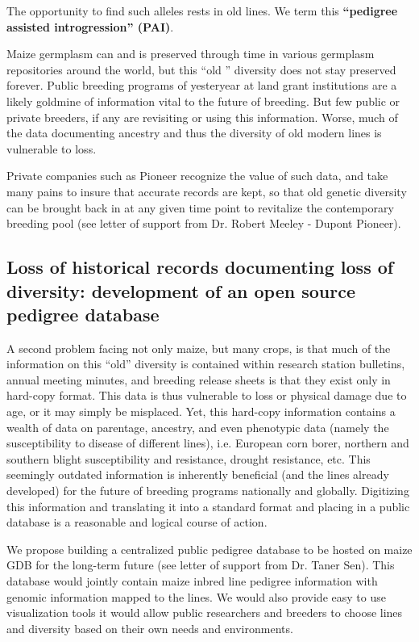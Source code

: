 \documentclass[12pt]{article}
\begin{document}
The opportunity to find such alleles rests in old lines. We term this \textbf{``pedigree assisted introgression'' (PAI)}.


Maize germplasm can and is preserved through time in various germplasm repositories around the world, but this ``old '' diversity  does not stay preserved forever. Public breeding programs of yesteryear at land grant institutions are a likely goldmine of information vital to the future of breeding. But few public or private breeders, if any are revisiting or using this information. Worse, much of the data documenting ancestry and thus the diversity of old modern lines is vulnerable to loss. 
\par Private companies such as Pioneer recognize the value of such data, and take many pains to insure that accurate records are kept, so that old genetic diversity can be brought back in at any given time point to revitalize the contemporary breeding pool (see letter of support from Dr. Robert Meeley - Dupont Pioneer).

\subsection{Loss of historical records documenting loss of diversity: development of an open source pedigree database}
A second problem facing not only maize, but many crops, is that much of the information on this ``old'' diversity is contained within research station bulletins, annual meeting minutes, and breeding release sheets is that they exist only in hard-copy format. This data is thus vulnerable to loss or physical damage due to age, or it may simply be misplaced. Yet, this hard-copy information contains a wealth of data on parentage, ancestry, and even phenotypic data (namely the susceptibility to disease of different lines), i.e. European corn borer, northern and southern blight susceptibility and resistance, drought resistance, etc. This seemingly outdated information is inherently beneficial (and the lines already developed) for the future of breeding programs nationally and globally. Digitizing this information and translating it into a standard format and placing in a public database is a reasonable and logical course of action.
\par We propose building a centralized public pedigree database to be hosted on maize GDB for the long-term future (see letter of support from Dr. Taner Sen). This database would jointly contain maize inbred line pedigree information with genomic information mapped to the lines. We would also provide easy to use visualization tools it would allow public researchers and breeders to choose lines and diversity based on their own needs and environments. 
\end{document}
